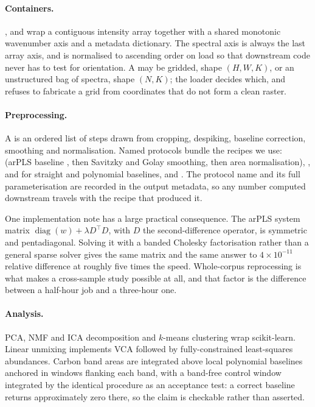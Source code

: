 \paragraph{Containers.}
,  and  wrap a
contiguous intensity array together with a shared monotonic wavenumber axis and
a metadata dictionary. The spectral axis is always the last array axis, and is
normalised to ascending order on load so that downstream code never has to test
for orientation. A  may be gridded, shape $(H,W,K)$, or an
unstructured bag of spectra, shape $(N,K)$; the loader decides which, and
refuses to fabricate a grid from coordinates that do not form a clean raster.

\paragraph{Preprocessing.}
A  is an ordered list of steps drawn from cropping, despiking,
baseline correction, smoothing and normalisation. Named protocols bundle the
recipes we use:  (arPLS baseline \cite{baek2015arpls},
then Savitzky and Golay smoothing, then area normalisation), ,
 and  for straight and polynomial baselines, and
. The protocol name and its full parameterisation are recorded in
the output metadata, so any number computed downstream travels with the recipe
that produced it.

One implementation note has a large practical consequence. The arPLS system
matrix $\operatorname{diag}(w) + \lambda D^{\!\top}\!D$, with $D$ the
second-difference operator, is symmetric and pentadiagonal. Solving it with a
banded Cholesky factorisation rather than a general sparse solver gives the
same matrix and the same answer to $4\times10^{-11}$ relative difference at
roughly five times the speed. Whole-corpus reprocessing is what makes a
cross-sample study possible at all, and that factor is the difference between
a half-hour job and a three-hour one.

\paragraph{Analysis.}
PCA, NMF and ICA decomposition and $k$-means clustering wrap scikit-learn.
Linear unmixing implements VCA \cite{nascimento2005vca} followed by
fully-constrained least-squares abundances. Carbon band areas are integrated
above local polynomial baselines anchored in windows flanking each band, with a
band-free control window integrated by the identical procedure as an acceptance
test: a correct baseline returns approximately zero there, so the claim is
checkable rather than asserted.

